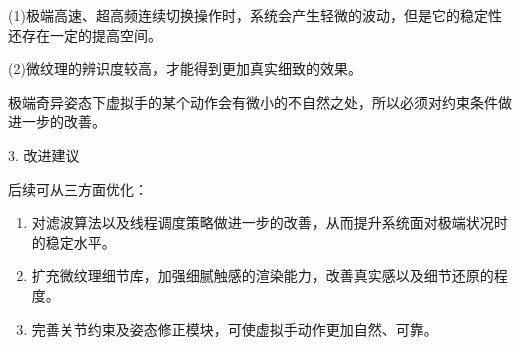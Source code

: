 (1)极端高速、超高频连续切换操作时，系统会产生轻微的波动，但是它的稳定性还存在一定的提高空间。

(2)微纹理的辨识度较高，才能得到更加真实细致的效果。

极端奇异姿态下虚拟手的某个动作会有微小的不自然之处，所以必须对约束条件做进一步的改善。

3. 改进建议

后续可从三方面优化：

\begin{enumerate}
\item
  对滤波算法以及线程调度策略做进一步的改善，从而提升系统面对极端状况时的稳定水平。
\item
  扩充微纹理细节库，加强细腻触感的渲染能力，改善真实感以及细节还原的程度。
\item
  完善关节约束及姿态修正模块，可使虚拟手动作更加自然、可靠。
\end{enumerate}
